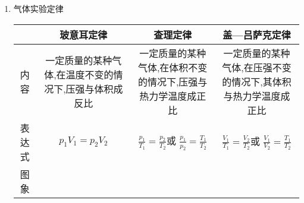 
\begin{enumerate}
\renewcommand{\labelenumi}{\arabic{enumi}.}
\item
气体实验定律
\begin{table}[h!]
\centering 
\begin{tabular}{|c|c|c|c|}
\hline 
& 玻意耳定律 & 查理定律 & 盖—吕萨克定律
\\
\hline
内容 & \begin{minipage}[h!]{0.2\linewidth}
\centering
\vspace{0.3em}
一定质量的某种气体,在温度不变的情况下,压强与体积成反比
\vspace{0.3em}
\end{minipage} & \begin{minipage}[h!]{0.2\linewidth}
\centering
\vspace{0.3em}
一定质量的某种气体,在体积不变的情况下,压强与热力学温度成正比
\vspace{0.3em}
\end{minipage} & 
\begin{minipage}[h!]{0.22\linewidth}
\centering
\vspace{0.3em}
一定质量的某种气体,在压强不变的情况下,其体积与热力学温度成正比
\vspace{0.3em}
\end{minipage} \\
\hline
表达式 & $p _ { 1 } V _ { 1 } = p _ { 2 } V _ { 2 }$ & $\frac { p _ { 1 } } { T _ { 1 } } = \frac { p _ { 2 } } { T _ { 2 } }$或 $\frac { p _ { 1 } } { p _ { 2 } } = \frac { T _ { 1 } } { T _ { 2 } }$& $\frac { V _ { 1 } } { T _ { 1 } } = \frac { V _ { 2 } } { T _ { 2 } }$或
$\frac { V _ { 1 } } { V _ { 2 } } = \frac { T _ { 1 } } { T _ { 2 } }$ \\
\hline
图象 &\begin{minipage}[h!]{0.2\linewidth}
\centering
\vspace{0.3em}

\vspace{0.3em}
\end{minipage} &\begin{minipage}[h!]{0.2\linewidth}
\centering
\vspace{0.3em}

\vspace{0.3em}
\end{minipage} & \begin{minipage}[h!]{0.2\linewidth}
\centering
\vspace{0.3em}

\vspace{0.3em}
\end{minipage}
\\
\hline
\end{tabular}
\end{table} 


\end{enumerate}

